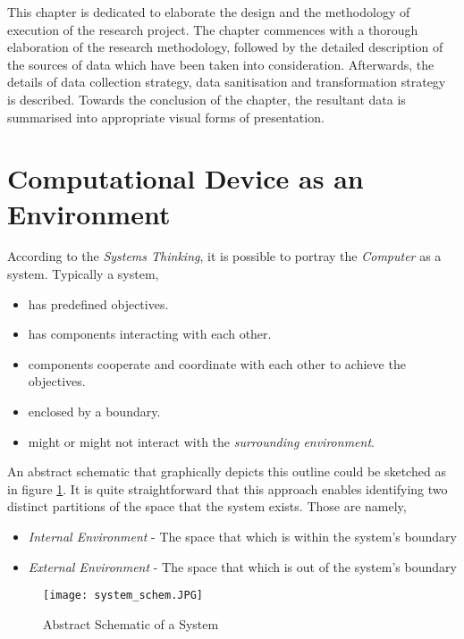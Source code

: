 This chapter is dedicated to elaborate the design and the methodology of execution of the research project. The chapter commences with a thorough elaboration of the research methodology, followed by the detailed description of the sources of data which have been taken into consideration. Afterwards, the details of data collection strategy, data sanitisation and transformation strategy is described. Towards the conclusion of the chapter, the resultant data is summarised into appropriate visual forms of presentation.

\section{Computational Device as an Environment}

According to the \textit{Systems Thinking}, it is possible to portray the \textit{Computer} as a system. Typically a system,

\begin{itemize}
    \item has predefined objectives.
    \item has components interacting with each other.
    \item components cooperate and coordinate with each other to achieve the objectives.
    \item enclosed by a boundary.
    \item might or might not interact with the \textit{surrounding environment}.
\end{itemize}

An abstract schematic that graphically depicts this outline could be sketched as in figure \ref{fig:abs_sys}. It is quite straightforward that this approach enables identifying two distinct partitions of the space that the system exists. Those are namely,

\begin{itemize}
    \item \textit{Internal Environment} - The space that which is within the system's boundary
    \item \textit{External Environment} - The space that which is out of the system's boundary
\end{itemize}

\begin{figure}[h!]
    \texttt{[image: system\_schem.JPG]}
    \centering
    \caption{Abstract Schematic of a System}
    \label{fig:abs_sys}
\end{figure}

